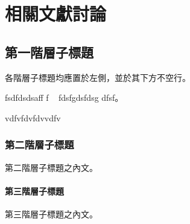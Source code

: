\chapter{相關文獻討論}
\label{c:2}

\section{第一階層子標題}

各階層子標題均應置於左側，並於其下方不空行。


fsdfdsdsaff f  ~\cite{Parker:2013}  fdsfgdsfdsg dfsf。

vdfvfdvfdvvdfv \cite{Hsiao:2018}


\subsection{第二階層子標題}

第二階層子標題之內文。

\subsubsection{第三階層子標題}

第三階層子標題之內文。

